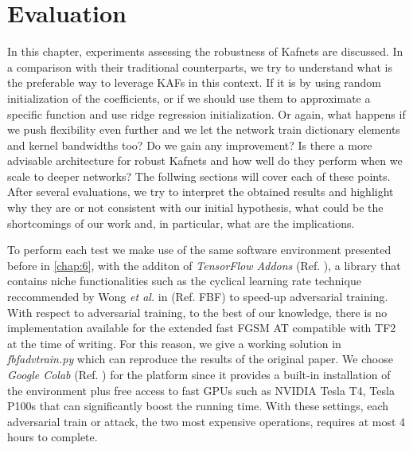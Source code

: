 \documentclass[LaM,binding=0.6cm]{./packages/sapthesis/sapthesis}
\begin{document}
       

        


\chapter{Evaluation}
\label{chap:7}
In this chapter, experiments assessing the robustness of Kafnets are discussed. In a comparison with their traditional counterparts, we try to understand 
what is the preferable way to leverage KAFs in this context. If it is by using random initialization of the coefficients, or if we should use them 
to approximate a specific function and use ridge regression initialization. Or again, what happens if we push flexibility even further and we let 
the network train dictionary elements and kernel bandwidths too? Do we gain any improvement? Is there a more advisable architecture for robust 
Kafnets and how well do they perform when we scale to deeper networks? The follwing sections will cover each of these points. After several evaluations,
we try to interpret the obtained results and highlight why they are or not consistent with our initial hypothesis, what could be the shortcomings of our 
work and, in particular, what are the implications. \par
To perform each test we make use of the same software environment presented before in \ref{chap:6}, with the additon of \textit{TensorFlow Addons} (Ref. ),
a library that contains niche functionalities such as the cyclical learning rate technique reccommended by Wong \textit{et al.} in (Ref. FBF) to speed-up adversarial training. 
With respect to adversarial training, to the best of our knowledge, there is no implementation available for the extended fast FGSM AT compatible with TF2
at the time of writing. For this reason, we give a working solution in \textit{fbfadvtrain.py} which can reproduce the results
of the original paper. We choose \textit{Google Colab} (Ref. ) for the platform since it provides a built-in installation of the environment plus free access 
to fast GPUs such as NVIDIA Tesla T4, Tesla P100s that can significantly boost the running time. With these settings, each adversarial train 
or attack, the two most expensive operations, 
requires at most 4 hours to complete.
\end{document}
